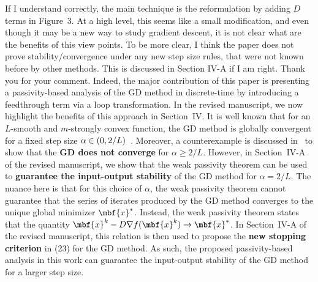 \begin{rebuttal}
    {%
        If I understand correctly, the main technique is the reformulation by adding $D$ terms in Figure~3. At a high level, this seems like a small modification, and even though it may be a new way to study gradient descent, it is not clear what are the benefits of this view points. To be more clear, I think the paper does not prove stability/convergence under any new step size rules, that were not known before by other methods. This is discussed in Section IV-A if I am right.
    }%
    {%
        Thank you for your comment. Indeed, the major contribution of this paper is presenting a passivity-based analysis of the GD method in discrete-time by introducing a feedthrough term via a loop transformation. In the revised manuscript, we now highlight the benefits of this approach in Section~IV\@. It is well known that for an $L$-smooth and $m$-strongly convex function, the GD method is globally convergent for a fixed step size \(\alpha \in \mleft( 0, 2/L \mright)\)~\cite[Theorem~2]{Polyak}. Moreover, a counterexample is discussed in~\cite{Polyak} to show that the \textbf{GD does not converge} for \(\alpha \geq 2/L\). However, in Section~IV-A of the revised manuscript, we show that the weak passivity theorem can be used to \textbf{guarantee the input-output stability} of the GD method for \(\alpha = 2/L\). The nuance here is that for this choice of \(\alpha\), the weak passivity theorem cannot guarantee that the series of iterates produced by the GD method converges to the unique global minimizer \(\mbf{x}^\ast\). Instead, the weak passivity theorem states that the quantity \(\mbf{x}^k-D \nabla f(\mbf{x}^k ) \to \mbf{x}^\ast\). In Section~IV-A of the revised manuscript, this relation is then used to propose the \textbf{new stopping criterion} in (23) for the GD method. As such, the proposed passivity-based analysis in this work can guarantee the input-output stability of the GD method for a larger step size.
    }%
\end{rebuttal}
